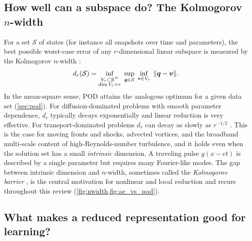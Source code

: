 \subsection{How well can a subspace do? The Kolmogorov \texorpdfstring{$n$}{n}-width}

For a set $\mathcal{S}$ of states (for instance all snapshots over time and
parameters), the best possible worst-case error of any $r$-dimensional linear
subspace is measured by the Kolmogorov $n$-width
\parencite{kolmogorov1936,pinkus1985nwidths}:
\begin{equation}
  d_{r}(\mathcal{S})=\inf_{\substack{V_r\subset\mathbb{R}^{N}\\ \dim V_r=r}}\;
  \sup_{\bm{q}\in\mathcal{S}}\;\inf_{\bm{v}\in V_r}\;\|\bm{q}-\bm{v}\|.
  \label{eq:nwidth}
\end{equation}
In the mean-square sense, POD attains the analogous optimum for a given data
set (\cref{sec:pod}). For diffusion-dominated problems with smooth parameter
dependence, $d_r$ typically decays exponentially and linear reduction is very
effective. For transport-dominated problems $d_r$ can decay as slowly as
$r^{-1/2}$ \parencite{ohlberger2016reduced,greif2019decay}. This is the case
for moving fronts and shocks, advected vortices, and the broadband multi-scale
content of high-Reynolds-number turbulence, and it holds even when the
solution set has a small \emph{intrinsic} dimension. A traveling pulse
$g(x-ct)$ is described by a single parameter but requires many Fourier-like
modes. The gap between intrinsic dimension and $n$-width, sometimes called the
\emph{Kolmogorov barrier} \parencite{peherstorfer2022breaking}, is the central
motivation for nonlinear and local reduction and recurs throughout this review
(\cref{fig:nwidth,fig:ae_vs_pod}).

\subsection{What makes a reduced representation good for learning?}
\label{sec:desiderata}

